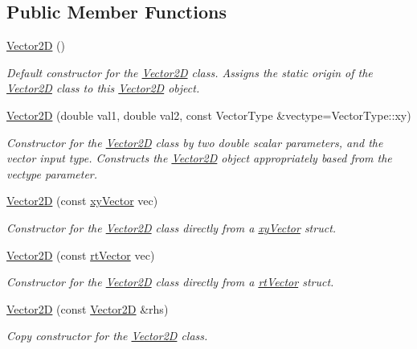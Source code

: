 \subsection*{Public Member Functions}
\begin{DoxyCompactItemize}
\item 
\hyperlink{class_vector2_d_a98e9997ebb7a629f4db52397d4e0d653}{Vector2D} ()
\begin{DoxyCompactList}\small\item\em Default constructor for the \hyperlink{class_vector2_d}{Vector2D} class. Assigns the static origin of the \hyperlink{class_vector2_d}{Vector2D} class to this \hyperlink{class_vector2_d}{Vector2D} object. \end{DoxyCompactList}\item 
\hyperlink{class_vector2_d_a0c1db105a3d49bde5056cc19b04f18c2}{Vector2D} (double val1, double val2, const Vector\+Type \&vectype=Vector\+Type\+::xy)
\begin{DoxyCompactList}\small\item\em Constructor for the \hyperlink{class_vector2_d}{Vector2D} class by two double scalar parameters, and the vector input type. Constructs the \hyperlink{class_vector2_d}{Vector2D} object appropriately based from the vectype parameter. \end{DoxyCompactList}\item 
\hyperlink{class_vector2_d_ab3aae16cfdb6eab642f832d82de2ac5c}{Vector2D} (const \hyperlink{structxy_vector}{xy\+Vector} vec)
\begin{DoxyCompactList}\small\item\em Constructor for the \hyperlink{class_vector2_d}{Vector2D} class directly from a \hyperlink{structxy_vector}{xy\+Vector} struct. \end{DoxyCompactList}\item 
\hyperlink{class_vector2_d_a3253f7c676f03f9d460d6b473934a1ff}{Vector2D} (const \hyperlink{structrt_vector}{rt\+Vector} vec)
\begin{DoxyCompactList}\small\item\em Constructor for the \hyperlink{class_vector2_d}{Vector2D} class directly from a \hyperlink{structrt_vector}{rt\+Vector} struct. \end{DoxyCompactList}\item 
\hyperlink{class_vector2_d_a658f4dd52408392ab5ad5fb36112a5c8}{Vector2D} (const \hyperlink{class_vector2_d}{Vector2D} \&rhs)
\begin{DoxyCompactList}\small\item\em Copy constructor for the \hyperlink{class_vector2_d}{Vector2D} class. \end{DoxyCompactList}\item 

\end{DoxyCompactItemize}
